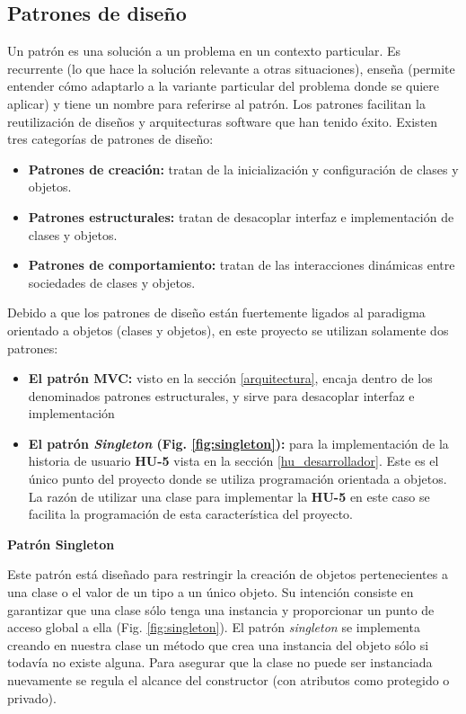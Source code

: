 \subsection{Patrones de diseño}
Un patrón es una solución a un problema en un contexto particular. Es recurrente (lo que hace la solución relevante a otras situaciones), enseña (permite entender cómo adaptarlo a la variante particular del problema donde se quiere aplicar) y tiene un nombre para referirse al patrón. Los patrones facilitan la reutilización de diseños y arquitecturas software que han tenido éxito. Existen tres categorías de patrones de diseño:
\begin{itemize}
\item \textbf{Patrones de creación:} tratan de la inicialización y configuración de clases y objetos.
\item \textbf{Patrones estructurales:} tratan de desacoplar interfaz e implementación de clases y objetos.
\item \textbf{Patrones de comportamiento:} tratan de las interacciones dinámicas entre sociedades de clases y objetos.
\end{itemize}

Debido a que los patrones de diseño están fuertemente ligados al paradigma orientado a objetos (clases y objetos), en este proyecto se utilizan solamente dos patrones:
\begin{itemize}
\item \textbf{El patrón MVC:} visto en la sección \ref{arquitectura}, encaja dentro de los denominados patrones estructurales, y sirve para desacoplar interfaz e implementación
\item \textbf{El patrón \textit{Singleton} (Fig. \ref{fig:singleton}):} para la implementación de la historia de usuario \textbf{HU-5} vista en la sección \ref{hu_desarrollador}. Este es el único punto del proyecto donde se utiliza programación orientada a objetos. La razón de utilizar una clase para implementar la \textbf{HU-5} en este caso se facilita la programación de esta característica del proyecto.
\end{itemize}

\noindent
\textbf{Patrón Singleton}

Este patrón está diseñado para restringir la creación de objetos pertenecientes a una clase o el valor de un tipo a un único objeto. Su intención consiste en garantizar que una clase sólo tenga una instancia y proporcionar un punto de acceso global a ella (Fig. \ref{fig:singleton}). El patrón \textit{singleton} se implementa creando en nuestra clase un método que crea una instancia del objeto sólo si todavía no existe alguna. Para asegurar que la clase no puede ser instanciada nuevamente se regula el alcance del constructor (con atributos como protegido o privado).

